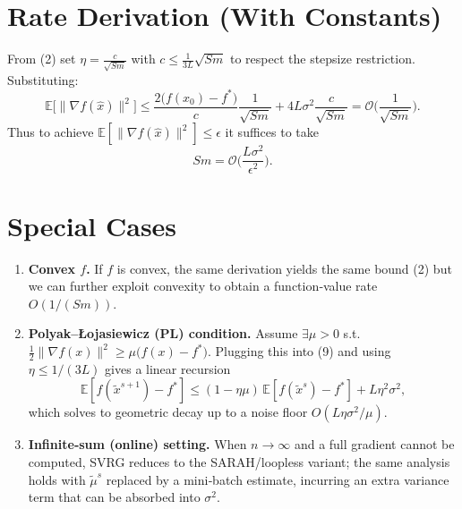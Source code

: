 \documentclass{article}
\begin{document}
\section*{Rate Derivation (With Constants)}
From (2) set $\eta = \frac{c}{\sqrt{Sm}}$ with $c\le\frac{1}{3L}\sqrt{Sm}$ to respect the stepsize restriction. Substituting:
\[
\mathbb{E}\!\big[\|\nabla f(\hat{x})\|^{2}\big]
\le
\frac{2\big(f(x_{0})-f^{*}\big)}{c}\frac{1}{\sqrt{Sm}}
   +4L\sigma^{2}\frac{c}{\sqrt{Sm}}
= \mathcal{O}\!\Big(\frac{1}{\sqrt{Sm}}\Big).
\]
Thus to achieve $\mathbb{E}[\|\nabla f(\hat{x})\|^{2}]\le\epsilon$ it suffices to take
\[
Sm = \mathcal{O}\!\Big(\frac{L\sigma^{2}}{\epsilon^{2}}\Big).
\]

\section*{Special Cases}
\begin{enumerate}
\item \textbf{Convex $f$.} If $f$ is convex, the same derivation yields the same bound (2) but we can further exploit convexity to obtain a function‑value rate $O(1/(Sm))$.
\item \textbf{Polyak–Łojasiewicz (PL) condition.} Assume $\exists\mu>0$ s.t. $\frac{1}{2}\|\nabla f(x)\|^{2}\ge\mu\big(f(x)-f^{*}\big)$. Plugging this into (9) and using $\eta\le1/(3L)$ gives a linear recursion
\[
\mathbb{E}[f(\tilde{x}^{s+1})-f^{*}]\le (1-\eta\mu)\,\mathbb{E}[f(\tilde{x}^{s})-f^{*}]+L\eta^{2}\sigma^{2},
\]
which solves to geometric decay up to a noise floor $O(L\eta\sigma^{2}/\mu)$.
\item \textbf{Infinite‑sum (online) setting.} When $n\to\infty$ and a full gradient cannot be computed, SVRG reduces to the SARAH/loopless variant; the same analysis holds with $\tilde{\mu}^{s}$ replaced by a mini‑batch estimate, incurring an extra variance term that can be absorbed into $\sigma^{2}$.
\end{enumerate}
\end{document}
